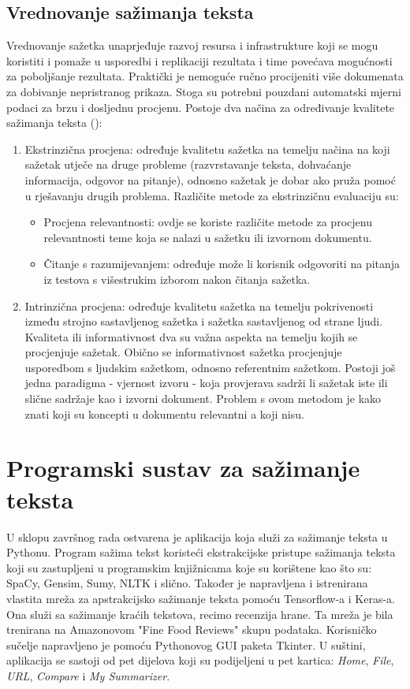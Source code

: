 \documentclass[times, utf8, zavrsni, numeric]{fer}
\begin{document}
\section{Vrednovanje sažimanja teksta}
Vrednovanje sažetka unaprjeđuje razvoj resursa i infrastrukture koji se mogu koristiti i pomaže u usporedbi i replikaciji rezultata i time povećava mogućnosti za poboljšanje rezultata.
Praktički je nemoguće ručno procijeniti više dokumenata za dobivanje nepristranog prikaza. Stoga su potrebni pouzdani automatski mjerni podaci za brzu i dosljednu procjenu.
Postoje dva načina za određivanje kvalitete sažimanja teksta (\citet{article1}):
\begin{enumerate}
  \item Ekstrinzična procjena: određuje kvalitetu sažetka na temelju načina na koji sažetak utječe na druge probleme (razvrstavanje teksta, dohvaćanje informacija, odgovor na pitanje), odnosno sažetak je dobar ako pruža pomoć u rješavanju drugih problema. Različite metode za ekstrinzičnu evaluaciju su:
  \begin{itemize}
    \item Procjena relevantnosti: ovdje se koriste različite metode za procjenu relevantnosti teme koja se nalazi u sažetku ili izvornom dokumentu.
    \item Čitanje s razumijevanjem: određuje može li korisnik odgovoriti na pitanja iz testova s višestrukim izborom nakon čitanja sažetka.
  \end{itemize}
  \item Intrinzična procjena: određuje kvalitetu sažetka na temelju pokrivenosti između strojno sastavljenog sažetka i sažetka sastavljenog od strane ljudi. Kvaliteta ili informativnost dva su važna aspekta na temelju kojih se procjenjuje sažetak. Obično se informativnost sažetka procjenjuje usporedbom s ljudskim sažetkom, odnosno referentnim sažetkom. Postoji još jedna paradigma - vjernost izvoru - koja provjerava sadrži li sažetak iste ili slične sadržaje kao i izvorni dokument. Problem s ovom metodom je kako znati koji su koncepti u dokumentu relevantni a koji nisu.
\end{enumerate}


\chapter{Programski sustav za sažimanje teksta}
U sklopu završnog rada ostvarena je aplikacija koja služi za sažimanje teksta u Pythonu. Program sažima tekst koristeći ekstrakcijske pristupe sažimanja teksta koji su zastupljeni u programskim knjižnicama koje su korištene kao što su: SpaCy, Gensim, Sumy, NLTK i slično.
Također je napravljena i istrenirana vlastita mreža za apstrakcijsko sažimanje teksta pomoću Tensorflow-a i Keras-a. Ona služi sa sažimanje kraćih tekstova, recimo recenzija hrane. Ta mreža je bila trenirana na Amazonovom "Fine Food Reviews" skupu podataka.
Korisničko sučelje napravljeno je pomoću Pythonovog GUI paketa Tkinter.
U suštini, aplikacija se sastoji od pet dijelova koji su podijeljeni u pet kartica: \emph{Home}, \emph{File}, \emph{URL}, \emph{Compare} i \emph{My Summarizer}.
\end{document}
